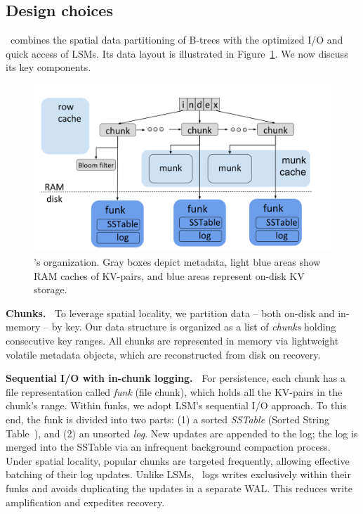 \subsection{Design choices}

\sys\ combines the spatial data partitioning of B-trees with the optimized I/O and quick access of LSMs. 
Its data layout is illustrated in Figure~\ref{fig:piwi}.  We now discuss its key components.   

\begin{figure}[tb]
\includegraphics[width=\columnwidth]{PiWi.png}
\caption{\sys's  organization. Gray boxes depict metadata, light blue areas show RAM caches of KV-pairs, and blue areas represent on-disk KV storage.}
\label{fig:piwi}
\end{figure}


{\bf Chunks.\ }
To leverage spatial locality, we partition data -- both on-disk and in-memory -- by key.
Our  data structure is organized as a 
list of \emph{chunks} holding consecutive key ranges. 
All chunks are represented in memory via lightweight volatile metadata objects, which are reconstructed from disk on recovery.

{\bf Sequential I/O with in-chunk logging.\ }
For persistence, each chunk has a file representation called  \emph{funk} (file chunk), which holds all the KV-pairs in the chunk's range.
Within funks, we adopt LSM's sequential I/O approach. To this end, the funk 
is divided into two parts: (1) a sorted \emph{SSTable} (Sorted String Table~\cite{Bigtable2008}), and (2) an unsorted \emph{log}. 
New updates are appended to the log; the log is  merged into the SSTable via an infrequent background compaction process. 
Under spatial locality,  popular chunks are targeted frequently, allowing effective batching of their log updates. 
Unlike LSMs, \sys\ logs writes exclusively within their funks and avoids duplicating the updates  in a separate WAL. This reduces write amplification and expedites recovery. 

